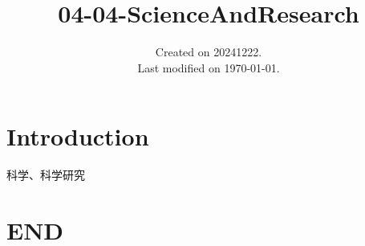 \documentclass[UTF8]{../../ApplicationUniverse}
\begin{document}
\title{04-04-ScienceAndResearch}
\date{Created on 20241222.\\   Last modified on \today.}
\maketitle
\tableofcontents


\chapter{Introduction}

科学、科学研究




\chapter{END}
\end{document}
